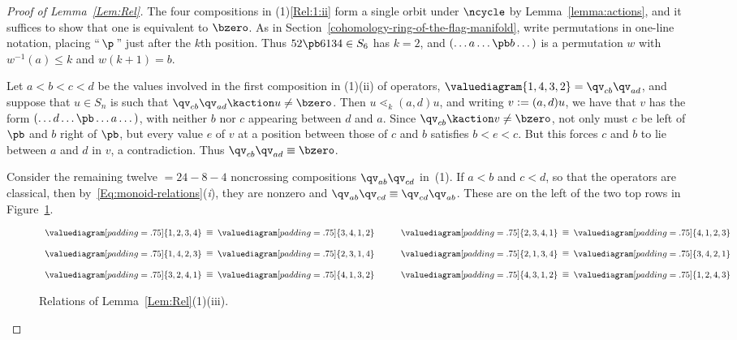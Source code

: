 \begin{proof}[Proof of Lemma~\ref{Lem:Rel}]
 The four compositions in (1)\ref{Rel:1:ii} form a single orbit under $\ncycle$ by Lemma~\ref{lemma:actions}, and it suffices to show that one is equivalent to $\bzero$.
 As in Section~\ref{cohomology-ring-of-the-flag-manifold}, 
 write permutations in one-line notation, placing ``\,$\p$\,'' just after the $k$th position.
 Thus $52\pb 6134\in S_6$ has $k=2$,
 and $(\dotsc a\dotsc \pb b \dotsc)$ is a permutation $w$ with $w^{-1}(a)\leq k$ and $w(k{+}1)=b$.

 Let $a<b<c<d$ be the values involved in the first composition in (1)(ii) of operators,
 $\valuediagram{{1,4},{3,2}}=\qv_{cb}\qv_{ad}$, and suppose that $u\in S_n$ is such that $\qv_{cb} \qv_{ad}\kaction u\neq\bzero$.
 Then $u\lessdot_k (a,d)u$, and writing $v \vcentcolon= (a,d)u$, we have that $v$ has the form  $(\dotsc d\dotsc \pb\dotsc a \dotsc)$,
 with neither $b$ nor $c$ appearing between $d$ and $a$.
 Since $\qv_{cb}\kaction v\neq\bzero$, not only must $c$ be left of $\pb$ and $b$ right of $\pb$, but every value $e$ of $v$
 at a position between those of $c$ and $b$ satisfies $b<e<c$.
 But this forces $c$ and $b$ to lie between $a$ and $d$ in $v$, a contradiction.
 Thus $\qv_{cb} \qv_{ad}\equiv\bzero$.

 Consider the remaining twelve $=24-8-4$ noncrossing compositions $\qv_{ab}\qv_{cd}$ in~(1).
 If $a<b$ and $c<d$, so that the operators are classical, then by~\eqref{Eq:monoid-relations}({\it i}), they are nonzero
 and $\qv_{ab}\qv_{cd}\equiv\qv_{cd}\qv_{ab}$.
 These are on the left of the two top rows in Figure~\ref{fig:degree-2-nonzero-relations}.

\begin{figure}[htpb]
 \[
   \begin{array}{r@{\hskip5pt}c@{\hskip5pt}l@{\hskip3em}r@{\hskip5pt}c@{\hskip5pt}l}
      \valuediagram[padding=.75]{{1,2},{3,4}} & \raisebox{1pt}{$\equiv$} & \valuediagram[padding=.75]{{3,4},{1,2}} &
      \valuediagram[padding=.75]{{2,3},{4,1}} & \raisebox{1pt}{$\equiv$} & \valuediagram[padding=.75]{{4,1},{2,3}}
      \\ \\
      \valuediagram[padding=.75]{{1,4},{2,3}} & \raisebox{1pt}{$\equiv$} & \valuediagram[padding=.75]{{2,3},{1,4}} &
      \valuediagram[padding=.75]{{2,1},{3,4}} & \raisebox{1pt}{$\equiv$} & \valuediagram[padding=.75]{{3,4},{2,1}}
      \\ \\
      \valuediagram[padding=.75]{{3,2},{4,1}} & \raisebox{1pt}{$\equiv$} & \valuediagram[padding=.75]{{4,1},{3,2}} &
      \valuediagram[padding=.75]{{4,3},{1,2}} & \raisebox{1pt}{$\equiv$} & \valuediagram[padding=.75]{{1,2},{4,3}}
   \end{array}
 \]
 \caption{Relations of Lemma~\ref{Lem:Rel}(1)(iii).}
 \label{fig:degree-2-nonzero-relations}
\end{figure}


\end{proof}
